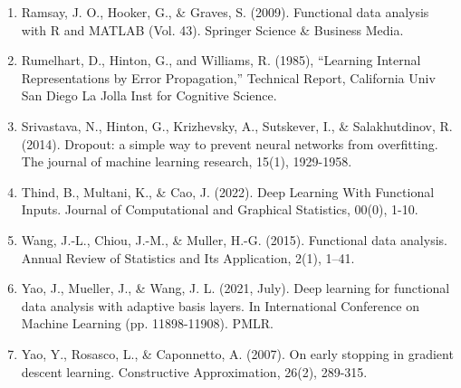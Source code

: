 \documentclass[
	9pt, %
]{beamer}
\begin{document}
\begin{frame}
{\begin{enumerate}
\item Ramsay, J. O., Hooker, G., \& Graves, S. (2009). Functional data analysis with R and MATLAB (Vol. 43). Springer Science \& Business Media.
\item Rumelhart, D., Hinton, G., and Williams, R. (1985), “Learning Internal Representations by Error Propagation,” Technical Report, California Univ San Diego La Jolla Inst for Cognitive Science.
\item Srivastava, N., Hinton, G., Krizhevsky, A., Sutskever, I., \& Salakhutdinov, R. (2014). Dropout: a simple way to prevent neural networks from overfitting. The journal of machine learning research, 15(1), 1929-1958.
\item Thind, B., Multani, K., \& Cao, J. (2022). Deep Learning With Functional Inputs. Journal of Computational and Graphical Statistics, 00(0), 1-10. 
\item Wang, J.-L., Chiou, J.-M., \& Muller, H.-G. (2015). Functional data analysis. Annual Review of Statistics and Its Application, 2(1), 1–41. 
\item Yao, J., Mueller, J., \& Wang, J. L. (2021, July). Deep learning for functional data analysis with adaptive basis layers. In International Conference on Machine Learning (pp. 11898-11908). PMLR.
\item Yao, Y., Rosasco, L., \& Caponnetto, A. (2007). On early stopping in gradient descent learning. Constructive Approximation, 26(2), 289-315.
\end{enumerate}}
\end{frame}

\end{document}
